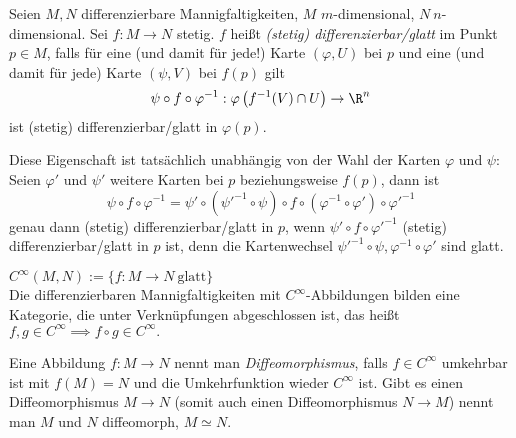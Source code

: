 \addtocounter{thm}{1}
\begin{defn}\lecture
	Seien $M,N$ differenzierbare Mannigfaltigkeiten, $M$ $m$-dimensional, $N\ n$-dimensional. Sei $ f: M \to N $  stetig. $f$ heißt \emph{(stetig) differenzierbar/glatt} im Punkt $p \in M$, falls für eine (und damit für jede!) Karte $ (\varphi,U) $ bei $p$ und eine (und damit für jede) Karte $ (\psi,V) $ bei $f(p)$ gilt
	\[ \psi \circ f \circ \varphi^{-1}: \varphi \left( f^{-1}(V) \cap U \right) \to \R^n \]
	ist (stetig) differenzierbar/glatt in $\varphi(p).$
\end{defn}

Diese Eigenschaft ist tatsächlich unabhängig von der Wahl der Karten $\varphi$ und $\psi$: Seien $ \varphi' $ und $\psi'$ weitere Karten bei $p$ beziehungsweise $f(p)$, dann ist 
\[ \psi \circ f \circ \varphi^{-1} = \psi' \circ \left( \psi'^{-1} \circ \psi \right) \circ f \circ \left( \varphi^{-1} \circ \varphi' \right) \circ \varphi'^{-1} \]
genau dann (stetig) differenzierbar/glatt in $p$, wenn $\psi' \circ f \circ \varphi'^{-1}$ (stetig) differenzierbar/glatt in $p$ ist, denn die Kartenwechsel $\psi'^{-1} \circ \psi, \varphi^{-1} \circ \varphi'$ sind glatt.

\begin{rem*}
	$ C^\infty (M,N) := \{ f: M \to N \ \text{glatt}\} $\\
	Die differenzierbaren Mannigfaltigkeiten mit $C^\infty$-Abbildungen bilden eine Kategorie, die unter Verknüpfungen abgeschlossen ist, das heißt $ f, g \in C^\infty \implies f \circ g \in C^\infty. $
\end{rem*}

\begin{defn}[Diffeomorphismus]
	Eine Abbildung $ f: M \to N $ nennt man \emph{Diffeomorphismus}, falls $ f \in C^\infty $ umkehrbar ist mit $ f(M)=N $ und die Umkehrfunktion wieder $C^\infty$ ist. Gibt es einen Diffeomorphismus $ M \to N $ (somit auch einen Diffeomorphismus $N \to M$) nennt man $M$ und $N$ diffeomorph, $M \simeq N$.
\end{defn}

